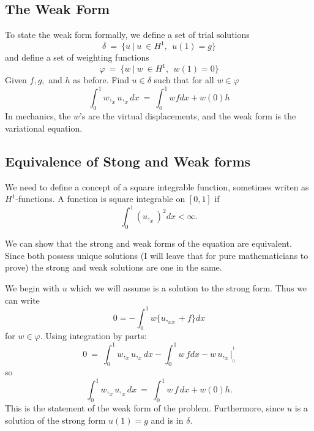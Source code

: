 \documentclass{article}
\begin{document}
\subsection{The Weak Form}

To state the weak form formally, we define a set of trial solutions
\begin{equation}
\delta ~=~ \{ u~|~u ~\in H^1 , ~~u(1)=g \}
\end{equation}
and define a set of weighting functions
\begin{equation}
\varphi ~=~ \{ w~|~w ~\in H^1 , ~~w(1)=0 \}
\end{equation}
Given $f, g,$ and $h$ as before. Find $u \in \delta$ such that for all
$w \in \varphi$
\begin{equation}
\int_0 ^1 w,_x u,_x dx ~=~ \int_0 ^1 w f dx + w(0) h 
\end{equation}
In mechanics, the $w$'s are the virtual displacements, and the weak form is the
variational equation.

\subsection{Equivalence of Stong and Weak forms}

We need to define a concept of a square integrable function, sometimes writen as
$H^1$-functions.   A function is square integrable on
$[0,1]$ if
\begin{equation}
\int_0^1 (u,_x)^2 dx < \infty.
\end{equation}

We can show that the strong and weak forms of the equation are equivalent. 
Since both possess unique solutions (I will leave that for pure mathematicians
to prove) the strong and weak solutions are one in the same.

We begin with $u$ which we will assume is a solution to the strong form.  Thus
we can write
\begin{equation}
0 = - \int_0 ^1 w \{ u,_{xx} + f \} dx
\end{equation}
for $w \in \varphi$.  Using integration by parts:
\begin{equation}
0 ~=~  \int_0 ^1 w,_x u,_x dx  -  \int_0 ^1 w\, f dx  - w\, u,_x |^{^1}_{_0}  
\end{equation} 
so
\begin{equation}
\int_0 ^1 w,_x u,_x dx ~=~ \int_0 ^1 w\, f\, dx + w(0) h.
\end{equation}
This is the statement of the weak form of the problem.  Furthermore, since $u$
is a solution of the strong form $u(1) = g$ and is in $\delta$.  
\end{document}
